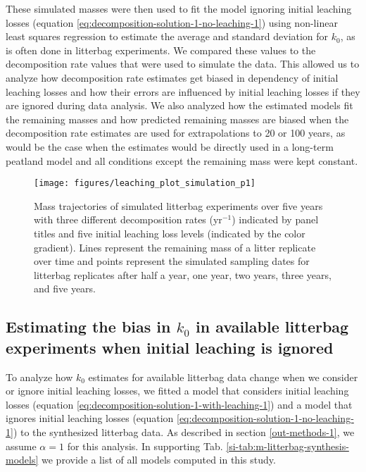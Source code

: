 \documentclass[bg, manuscript]{copernicus}
\begin{document}
These simulated masses were then used to fit the model ignoring initial leaching losses (equation \eqref{eq:decomposition-solution-1-no-leaching-1}) using non-linear least squares regression to estimate the average and standard deviation for \(k_0\), as is often done in litterbag experiments. We compared these values to the decomposition rate values that were used to simulate the data. This allowed us to analyze how decomposition rate estimates get biased in dependency of initial leaching losses and how their errors are influenced by initial leaching losses if they are ignored during data analysis. We also analyzed how the estimated models fit the remaining masses and how predicted remaining masses are biased when the decomposition rate estimates are used for extrapolations to 20 or 100 years, as would be the case when the estimates would be directly used in a long-term peatland model and all conditions except the remaining mass were kept constant.



\begin{figure}[H]

{\centering \texttt{[image: figures/leaching\_plot\_simulation\_p1]} 

}

\caption{Mass trajectories of simulated litterbag experiments over five years with three different decomposition rates (yr\(^{-1}\)) indicated by panel titles and five initial leaching loss levels (indicated by the color gradient). Lines represent the remaining mass of a litter replicate over time and points represent the simulated sampling dates for litterbag replicates after half a year, one year, two years, three years, and five years.}\label{fig:out-simulation-p1}
\end{figure}

\hypertarget{methods-bias-real-1}{%
\subsection{\texorpdfstring{Estimating the bias in \(k_0\) in available litterbag experiments when initial leaching is ignored}{Estimating the bias in k\_0 in available litterbag experiments when initial leaching is ignored}}\label{methods-bias-real-1}}

To analyze how \(k_0\) estimates for available litterbag data change when we consider or ignore initial leaching losses, we fitted a model that considers initial leaching losses (equation \eqref{eq:decomposition-solution-1-with-leaching-1}) and a model that ignores initial leaching losses (equation \eqref{eq:decomposition-solution-1-no-leaching-1}) to the synthesized litterbag data. As described in section \ref{out-methods-1}, we assume \(\alpha=1\) for this analysis. In supporting Tab. \ref{si-tab:m-litterbag-synthesis-models} we provide a list of all models computed in this study.
\end{document}
